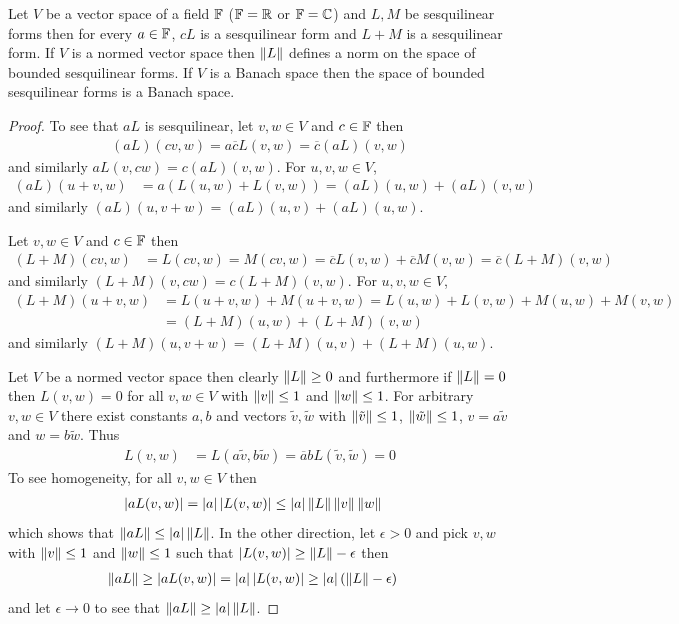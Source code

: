 \begin{prop}\label{hilbert:LinearCombinationSesquilinear}Let $V$ be a
  vector space of a field $\mathbb{F}$ ($\mathbb{F} = \mathbb{R}$ or $\mathbb{F} =
  \mathbb{C}$) and $L,M$ be sesquilinear forms then for every $a \in
  \mathbb{F}$, $cL$ is a sesquilinear form and $L+M$ is a sesquilinear
  form.  If $V$ is a normed vector space then $\left \lVert L \right \rVert$ defines a
  norm on the space of bounded sesquilinear forms.  If $V$ is a Banach space
  then the space of bounded sesquilinear forms is a Banach space.
\end{prop}
\begin{proof}
To see that $aL$ is sesquilinear, let $v,w \in V$ and $c \in \mathbb{F}$ then 
\begin{align*}
(aL)(cv, w)= a \overline{c} L(v,w) = \overline{c} (aL)(v,w)
\end{align*}
and similarly $aL(v, cw) = c (aL)(v,w)$.  For $u,v,w \in V$, 
\begin{align*}
(aL)(u+v, w) &=a(L(u,w) + L(v,w)) =(aL)(u,w) + (aL)(v,w)
\end{align*}
and similarly $(aL)(u,v+w) = (aL)(u,v)+(aL)(u,w)$.  

Let $v,w \in V$ and $c \in \mathbb{F}$ then 
\begin{align*}
(L+M)(cv, w)&= L(cv,w) = M(cv,w) = \overline{c} L(v,w)+\overline{c} M(v,w) = \overline{c} (L+M)(v,w)
\end{align*}
and similarly $(L+M)(v, cw) = c (L+M)(v,w)$.  For $u,v,w \in V$, 
\begin{align*}
(L+M)(u+v, w) &= L(u+v,w) + M(u+v,w) = L(u,w) + L(v,w) + M(u,w) + M(v,w) \\
&=(L+M)(u,w) + (L+M)(v,w)
\end{align*}
and similarly $(L+M)(u,v+w) = (L+M)(u,v)+(L+M)(u,w)$.

Let $V$ be a normed vector space then clearly $\left \lVert L \right \rVert \geq 0$ and furthermore if $\left \lVert L \right \rVert = 0$ then $L(v,w) = 0$ for all $v,w \in V$ with $\left \lVert v \right \rVert \leq 1$ and $\left \lVert w \right \rVert \leq 1$.  For arbitrary $v,w \in V$ there exist constants $a,b$ and vectors $\tilde{v}, \tilde{w}$ with $\left \lVert \tilde{v} \right \rVert \leq 1$, $\left \lVert \tilde{w} \right \rVert \leq 1$, $v = a \tilde{v}$ and $w= b\tilde{w}$.  Thus 
\begin{align*}
L(v,w) &= L(a\tilde{v}, b \tilde{w}) = \overline{a} b L(\tilde{v}, \tilde{w}) = 0
\end{align*}
To see homogeneity, for all $v, w \in V$ then
\begin{align*}
\left \vert aL(v,w) \right \vert &= \left \vert a \right \vert \left \vert L(v,w) \right \vert\leq \left \vert a \right \vert \left \lVert L \right \rVert \left \lVert v \right \rVert \left \lVert w \right \rVert
\end{align*}
which shows that $\left \lVert aL \right \rVert \leq \left \vert a \right \vert \left \lVert L \right \rVert$.  In the other direction, let $\epsilon > 0$ and pick $v,w$ with $\left \lVert v \right \rVert \leq 1$ and $\left \lVert w \right \rVert \leq 1$ such that $\left \vert L(v,w) \right \vert \geq \left \lVert L \right \rVert - \epsilon$ then 
\begin{align*}
\left \lVert aL \right \rVert &\geq \left \vert aL(v,w) \right \vert = \left \vert a \right \vert \left \vert L(v,w) \right \vert \geq \left \vert a \right \vert (\left \lVert L \right \rVert - \epsilon)
\end{align*}
and let $\epsilon \to 0$ to see that $\left \lVert aL \right \rVert \geq \left \vert a \right \vert \left \lVert L \right \rVert$.


\end{proof}

